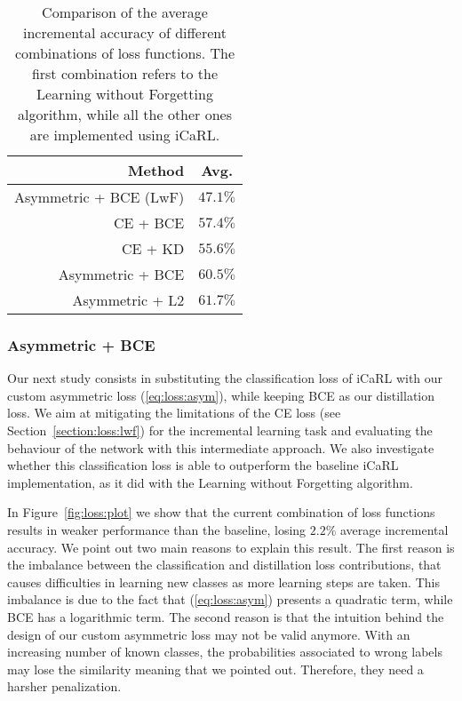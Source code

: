 \documentclass[10pt,twocolumn,letterpaper]{article}
\begin{document}
\begin{table}
    \begin{center}
        \begin{tabular}{|r|c|}
        \hline
        Method & Avg. \\
        \hline\hline
        Asymmetric + BCE (LwF) & $47.1\%$ \\
        CE + BCE & $57.4\%$ \\
        CE + KD &  $55.6\%$ \\
        Asymmetric + BCE &  $60.5\%$ \\
        Asymmetric + L2 &  $61.7\%$ \\
        \hline
        \end{tabular}
    \end{center}
\caption{Comparison of the average incremental accuracy of different combinations of loss functions. The first combination refers to the Learning without Forgetting algorithm, while all the other ones are implemented using iCaRL.}
\label{tab:loss}
\end{table}

\subsubsection{Asymmetric + BCE}
\label{asymbce}
Our next study consists in substituting the classification loss of iCaRL with our custom asymmetric loss (\ref{eq:loss:asym}), while keeping BCE as our distillation loss. We aim at mitigating the limitations of the CE loss (see Section~\ref{section:loss:lwf}) for the incremental learning task and evaluating the behaviour of the network with this intermediate approach. We also investigate whether this classification loss is able to outperform the baseline iCaRL implementation, as it did with the Learning without Forgetting algorithm.

In Figure~\ref{fig:loss:plot} we show that the current combination of loss functions results in weaker performance than the baseline, losing $2.2\%$ average incremental accuracy. We point out two main reasons to explain this result. The first reason is the imbalance between the classification and distillation loss contributions, that causes difficulties in learning new classes as more learning steps are taken. This imbalance is due to the fact that (\ref{eq:loss:asym}) presents a quadratic term, while BCE has a logarithmic term. The second reason is that the intuition behind the design of our custom asymmetric loss may not be valid anymore. With an increasing number of known classes, the probabilities associated to wrong labels may lose the similarity meaning that we pointed out. Therefore, they need a harsher penalization.
\end{document}
